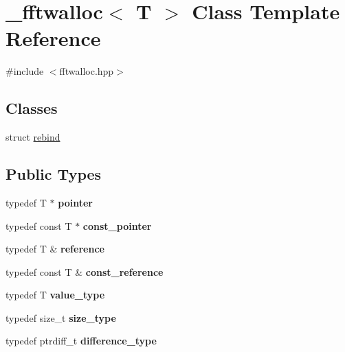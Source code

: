 \hypertarget{class__fftwalloc}{}\section{\+\_\+fftwalloc$<$ T $>$ Class Template Reference}
\label{class__fftwalloc}


{\ttfamily \#include $<$fftwalloc.\+hpp$>$}

\subsection*{Classes}
\begin{DoxyCompactItemize}
\item 
struct \hyperlink{struct__fftwalloc_1_1rebind}{rebind}
\end{DoxyCompactItemize}
\subsection*{Public Types}
\begin{DoxyCompactItemize}
\item 
\mbox{\label{class__fftwalloc_aa39bf0bf7c81e62434dcfe71ab0ee0eb}} 
typedef T $\ast$ {\bfseries pointer}
\item 
\mbox{\label{class__fftwalloc_a226bc1d494aa6b8224578dd6ba27045d}} 
typedef const T $\ast$ {\bfseries const\+\_\+pointer}
\item 
\mbox{\label{class__fftwalloc_a17bbb853161aa48edd58e827e6c74ad8}} 
typedef T \& {\bfseries reference}
\item 
\mbox{\label{class__fftwalloc_a165785478480616a8f645f33f4374117}} 
typedef const T \& {\bfseries const\+\_\+reference}
\item 
\mbox{\label{class__fftwalloc_aa1358d579b838daa085c1b85efdc3857}} 
typedef T {\bfseries value\+\_\+type}
\item 
\mbox{\label{class__fftwalloc_a2c184fee5e28c8e961d3cbe63142e887}} 
typedef size\+\_\+t {\bfseries size\+\_\+type}
\item 
\mbox{\label{class__fftwalloc_a5416536647a7a201ec0f718e2aab9e63}} 
typedef ptrdiff\+\_\+t {\bfseries difference\+\_\+type}
\end{DoxyCompactItemize}
